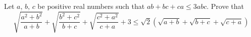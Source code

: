 Let $a$,  $b$,  $c$ be positive real numbers such that $ab+bc+ca\leq 3abc$. Prove that\[\sqrt{\frac{a^2+b^2}{a+b}}+\sqrt{\frac{b^2+c^2}{b+c}}+\sqrt{\frac{c^2+a^2}{c+a}}+3\leq \sqrt{2}\left(\sqrt{a+b}+\sqrt{b+c}+\sqrt{c+a}\right)\]
